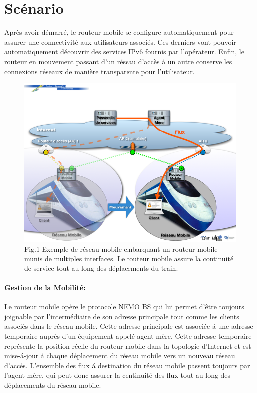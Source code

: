 \documentclass[12pt]{article}
\begin{document}
\newpage
\section{Sc\'{e}nario}

Apr\`{e}s avoir d\'{e}marr\'{e}, le routeur mobile se configure automatiquement pour assurer une connectivit\'{e} aux utilisateurs associ\'{e}s. Ces derniers vont pouvoir automatiquement d\'{e}couvrir des services IPv6 fournis par l'op\'{e}rateur. Enfin, le routeur en mouvement passant d'un r\'{e}seau d'acc\`{e}s à un autre conserve les connexions r\'{e}seaux de mani\`{e}re transparente pour l'utilisateur.

\begin{figure}[h]
\begin{center}
\includegraphics[scale=0.7]{R2.png}
\caption[9pt]{Fig.1 Exemple de r\'{e}seau mobile embarquant un routeur mobile munis de multiples interfaces. Le routeur mobile assure la continuit\'{e} de service tout au long des d\'{e}placements du train.}
\end{center}
\end{figure}

\newpage
\paragraph{Gestion de la Mobilit\'{e}:} 
Le routeur mobile op\`{e}re le protocole NEMO BS qui lui permet d'\^{e}tre toujours joignable par l'interm\'{e}diaire de son adresse principale tout comme les clients associ\'{e}s dans le r\'{e}seau mobile. Cette adresse principale est associ\'{e}e \'{a} une adresse temporaire aupr\`{e}s d'un \'{e}quipement appel\'{e} agent m\`{e}re. Cette adresse temporaire repr\'{e}sente la position r\'{e}elle du routeur mobile dans la topologie d'Internet et est mise-\'{a}-jour \'{a} chaque d\'{e}placement du r\'{e}seau mobile vers un nouveau r\'{e}seau d'acc\'{e}s.
L'ensemble des flux \'{a} destination du r\'{e}seau mobile passent toujours par l'agent m\`{e}re, qui peut donc assurer la continuit\'{e} des flux tout au long des d\'{e}placements du r\'{e}seau mobile.
\end{document}
